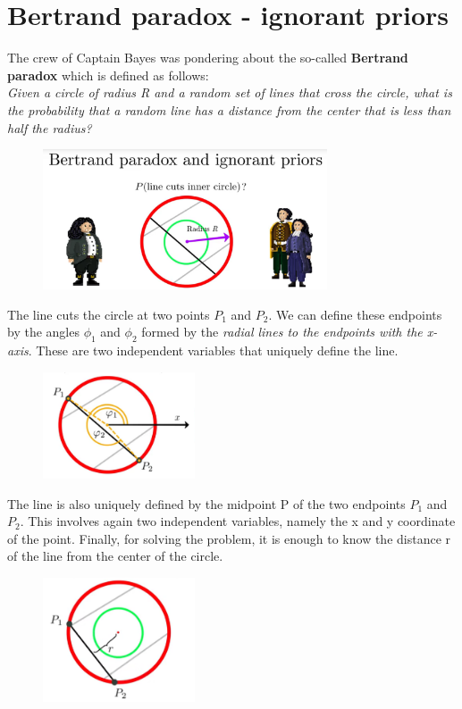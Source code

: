 \documentclass[12pt, a4paper]{scrartcl}
\begin{document}
\section*{Bertrand paradox - ignorant priors}
The crew of Captain Bayes was pondering about the so-called \textbf{Bertrand paradox} which is deﬁned as follows:\\
\textit{Given a circle of radius R and a random set of lines that cross the circle,
what is the probability that a random line has a distance from the center that is less than half the radius?}\\%
 \begin{figure}[H]
	\centering
	\includegraphics[width=0.75\textwidth]{8_3.png}
\end{figure}

The line cuts the circle at two points $P_1$ and $P_2$.
We can define these endpoints by the angles $\phi_1$ and $\phi_2$ formed by the \textit{radial lines to the endpoints with the x-axis}. These are two independent variables that uniquely deﬁne the line.\\%
 \begin{figure}[H]
	\centering
	\includegraphics[width=0.4\textwidth]{8_4.png}
\end{figure}

The line is also uniquely defined by the midpoint P of the two endpoints $P_1$ and $P_2$. 
This involves again two
independent variables, namely the x and y coordinate of the point. Finally, for solving the problem, it is enough to know the distance r of the line from the center of the circle.\\%
 \begin{figure}[H]
	\centering
	\includegraphics[width=0.4\textwidth]{8_5.png}
\end{figure}
\end{document}
